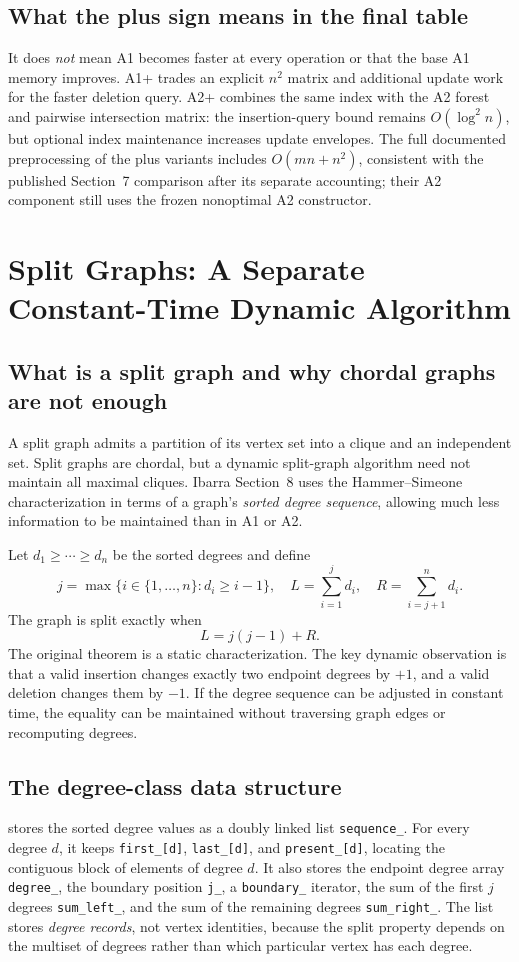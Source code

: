 \subsection{What the plus sign means in the final table}
It does \emph{not} mean A1 becomes faster at every operation or that the base A1 memory improves.  A1+ trades an explicit \(n^2\) matrix and additional update work for the faster deletion query.  A2+ combines the same index with the A2 forest and pairwise intersection matrix: the insertion-query bound remains \(O(\log^2n)\), but optional index maintenance increases update envelopes.  The full documented preprocessing of the plus variants includes \(O(mn+n^2)\), consistent with the published Section~7 comparison after its separate accounting; their A2 component still uses the frozen nonoptimal A2 constructor.

\section{Split Graphs: A Separate Constant-Time Dynamic Algorithm}
\label{sec:split-full}
\subsection{What is a split graph and why chordal graphs are not enough}
A split graph admits a partition of its vertex set into a clique and an independent set.  Split graphs are chordal, but a dynamic split-graph algorithm need not maintain all maximal cliques.  Ibarra Section~8 uses the Hammer--Simeone characterization in terms of a graph's \emph{sorted degree sequence}, allowing much less information to be maintained than in A1 or A2.

Let \(d_1\ge\cdots\ge d_n\) be the sorted degrees and define
\[
j=\max\{i\in\{1,\ldots,n\}:d_i\ge i-1\},
\quad L=\sum_{i=1}^{j}d_i,
\quad R=\sum_{i=j+1}^n d_i.
\]
The graph is split exactly when
\[
L=j(j-1)+R.
\]
The original theorem is a static characterization.  The key dynamic observation is that a valid insertion changes exactly two endpoint degrees by \(+1\), and a valid deletion changes them by \(-1\).  If the degree sequence can be adjusted in constant time, the equality can be maintained without traversing graph edges or recomputing degrees.

\subsection{The degree-class data structure}
 stores the sorted degree values as a doubly linked list \texttt{sequence\_}.  For every degree \(d\), it keeps \texttt{first\_[d]}, \texttt{last\_[d]}, and \texttt{present\_[d]}, locating the contiguous block of elements of degree \(d\).  It also stores the endpoint degree array \texttt{degree\_}, the boundary position \texttt{j\_}, a \texttt{boundary\_} iterator, the sum of the first \(j\) degrees \texttt{sum\_left\_}, and the sum of the remaining degrees \texttt{sum\_right\_}.  The list stores \emph{degree records}, not vertex identities, because the split property depends on the multiset of degrees rather than which particular vertex has each degree.

